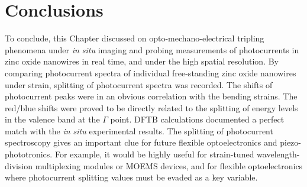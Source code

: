 \section{Conclusions}
To conclude, this Chapter discussed on opto-mechano-electrical tripling phenomena under {\em in situ} imaging and probing measurements of photocurrents in zinc oxide nanowires in real time, and under the high spatial resolution. 
By comparing photocurrent spectra of individual free-standing zinc oxide nanowires under strain, splitting of photocurrent spectra was recorded. 
The shifts of photocurrent peaks were in an obvious correlation with the bending strains. 
The red/blue shifts were proved to be directly related to the splitting of energy levels in the valence band at the $\Gamma$ point. 
DFTB calculations documented a perfect match with the {\em in situ} experimental results. 
The splitting of photocurrent spectroscopy gives an important clue for future flexible optoelectronics and piezo-phototronics. 
For example, it would be highly useful for strain-tuned wavelength-division multiplexing modules or MOEMS devices, and for flexible optoelectronics where photocurrent splitting values must be evaded as a key variable. 